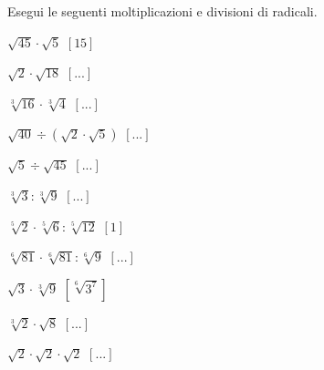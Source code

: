 \begin{esercizio}[\Ast]
 \label{ese:2.32}
Esegui le seguenti moltiplicazioni e divisioni di radicali.
 \begin{multicols}{3}
 \begin{enumeratea}
 \item \(\sqrt{45}\cdot \sqrt 5\)
  \hfill \(\left[15\right]\)
 \item \(\sqrt 2\cdot \sqrt{18}\)
  \hfill \(\left[...\right]\)
 \item \(\sqrt[3]{16}\cdot \sqrt[3]4\)
  \hfill \(\left[...\right]\)
 \item \(\sqrt{40}\div(\sqrt{2}\cdot \sqrt{5})\)
  \hfill \(\left[...\right]\)
 \item \(\sqrt{5} \div \sqrt{45}\)
  \hfill \(\left[...\right]\)
 \item \(\sqrt[3]3:\sqrt[3]9\)
  \hfill \(\left[...\right]\)
 \item \(\sqrt[5]2\cdot \sqrt[5]6:\sqrt[5]{12}\)
  \hfill \(\left[1\right]\)
 \item \(\sqrt[6]{81}\cdot \sqrt[6]{81}:\sqrt[6]9\)
  \hfill \(\left[...\right]\)
 \item \(\sqrt 3\cdot \sqrt[3]9\)
  \hfill \(\left[\sqrt[6]{3^7}\right]\)
 \item \(\sqrt[3]2\cdot \sqrt 8\)
  \hfill \(\left[...\right]\)
 \item \(\sqrt 2\cdot \sqrt 2\cdot\sqrt 2\)
  \hfill \(\left[...\right]\)
 \end{enumeratea}
 \end{multicols}
\end{esercizio}

